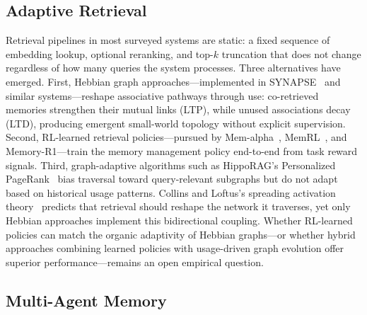 \subsection{Adaptive Retrieval}

Retrieval pipelines in most surveyed systems are static: a fixed
sequence of embedding lookup, optional reranking, and top-$k$
truncation that does not change regardless of how many queries the
system processes. Three alternatives have emerged. First, Hebbian
graph approaches---implemented in
SYNAPSE~\cite{jiang2026synapse} and similar systems---reshape associative pathways
through use: co-retrieved memories strengthen their mutual links
(LTP), while unused associations decay (LTD), producing emergent
small-world topology without explicit supervision. Second, RL-learned
retrieval policies---pursued by
Mem-alpha~\cite{wang2025memalpha},
MemRL~\cite{zhang2026memrl}, and Memory-R1---train the memory
management policy end-to-end from task reward signals. Third,
graph-adaptive algorithms such as HippoRAG's Personalized
PageRank~\cite{gutierrez2024hipporag} bias traversal toward
query-relevant subgraphs but do not adapt based on historical usage
patterns. Collins and Loftus's spreading activation
theory~\cite{collins1975} predicts that retrieval should reshape the
network it traverses, yet only Hebbian approaches implement this
bidirectional coupling. Whether RL-learned policies can match the
organic adaptivity of Hebbian graphs---or whether hybrid approaches
combining learned policies with usage-driven graph evolution offer
superior performance---remains an open empirical question.

\subsection{Multi-Agent Memory}

